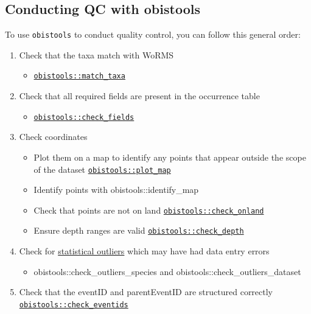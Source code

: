 \documentclass[
  letterpaper,
  DIV=11,
  numbers=noendperiod,
  oneside]{scrreprt}
\providecommand{\tightlist}{%
  \setlength{\itemsep}{0pt}\setlength{\parskip}{0pt}}\usepackage{longtable,booktabs,array}
\begin{document}
\hypertarget{conducting-qc-with-obistools}{%
\subsection{Conducting QC with
obistools}\label{conducting-qc-with-obistools}}

To use \texttt{obistools} to conduct quality control, you can follow
this general order:

\begin{enumerate}
\def\labelenumi{\arabic{enumi}.}
\tightlist
\item
  Check that the taxa match with WoRMS

  \begin{itemize}
  \tightlist
  \item
    \href{https://github.com/iobis/obistools\#taxon-matching}{\texttt{obistools::match\_taxa}}
  \end{itemize}
\item
  Check that all required fields are present in the occurrence table

  \begin{itemize}
  \tightlist
  \item
    \href{https://github.com/iobis/obistools\#check-required-fields}{\texttt{obistools::check\_fields}}
  \end{itemize}
\item
  Check coordinates

  \begin{itemize}
  \tightlist
  \item
    Plot them on a map to identify any points that appear outside the
    scope of the dataset
    \href{https://github.com/iobis/obistools\#plot-points-on-a-map}{\texttt{obistools::plot\_map}}
  \item
    Identify points with obistools::identify\_map
  \item
    Check that points are not on land
    \href{https://github.com/iobis/obistools\#check-points-on-land}{\texttt{obistools::check\_onland}}
  \item
    Ensure depth ranges are valid
    \href{https://github.com/iobis/obistools\#check-depth}{\texttt{obistools::check\_depth}}
  \end{itemize}
\item
  Check for
  \href{https://github.com/iobis/obistools\#check-outliers}{statistical
  outliers} which may have had data entry errors

  \begin{itemize}
  \tightlist
  \item
    obistools::check\_outliers\_species and
    obistools::check\_outliers\_dataset
  \end{itemize}
\item
  Check that the eventID and parentEventID are structured correctly
  \href{https://github.com/iobis/obistools\#check-outliers}{\texttt{obistools::check\_eventids}}


\end{enumerate}
\end{document}
